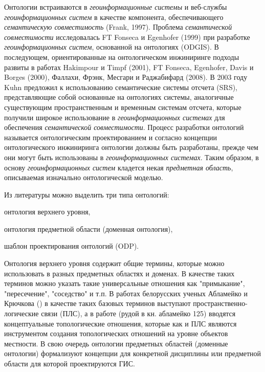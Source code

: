 Онтологии встраиваются в \textit{геоинформационные системы} и веб-службы
\textit{геоинформационных систем} в качестве компонента, обеспечивающего \textit{семантическую совместимость} (Frank, 1997). Проблема \textit{семантической совместимости} исследовалась FT Fonseca и Egenhofer (1999) при разработке \textit{геоинформационных систем}, основанной на онтологиях (ODGIS). В последующем, ориентированные на онтологическом инжиниринге подходы  развиты в работах Hakimpour и Timpf (2001), FT Fonseca, Egenhofer, Davis и Borges (2000), Фаллахи, Фрэнк, Месгари и Раджабифард (2008). В 2003 году Kuhn предложил к использованию семантические системы отсчета (SRS), представляющие собой основанные на онтологиях системы, аналогичные существующим пространственным и временным системам отсчета, которые получили широкое использование в \textit{геоинформационных системах} для обеспечения \textit{семантической совместимости}.
Процесс разработки онтологий называется онтологическим проектированием и согласно концепции онтологического инжиниринга онтологии должны быть разработаны, прежде чем они могут быть использованы в \textit{геоинформационных системах}. Таким образом, в основу \textit{геоинформационных систем} кладется некая \textit{предметная область}, описываемая изначально онтологической моделью. 

Из литературы можно выделить три типа онтологий: 
\begin{textitemize}
	\item онтология верхнего уровня, 
	\item онтология предметной области (доменная онтология), 
	\item шаблон проектирования онтологий (ODP).
\end{textitemize}

Онтология верхнего уровня содержит общие термины, которые можно использовать в разных предметных областях и доменах. В качестве таких терминов можно указать такие универсальные отношения как "примыкание", "пересечение", "соседство" и т.п. В работах белорусских ученых Абламейко и Крючкова () в качестве таких базовых терминов выступают пространственно-логические связи (ПЛС), а в работе (рудой в кн. абламейко 125) вводятся концептуальные топологические отношения, которые как и ПЛС являются инструментом создания топологических отношений на уровне объектов местности.  
В свою очередь онтологии предметных областей (доменные онтологии) формализуют концепции для конкретной дисциплины или предметной области  для которой проектируются ГИС. 

